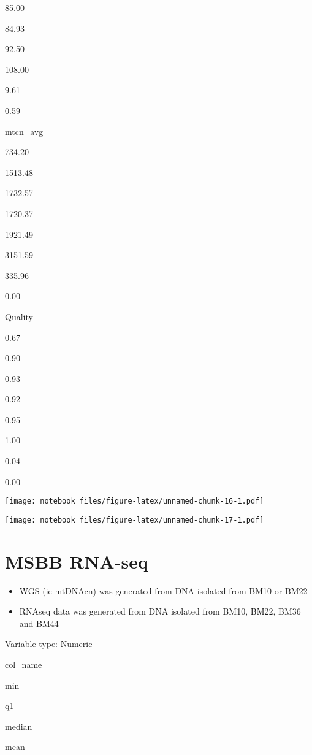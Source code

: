 \documentclass[]{book}
\providecommand{\tightlist}{%
  \setlength{\itemsep}{0pt}\setlength{\parskip}{0pt}}
\begin{document}
85.00

84.93

92.50

108.00

9.61

0.59

mtcn\_avg

734.20

1513.48

1732.57

1720.37

1921.49

3151.59

335.96

0.00

Quality

0.67

0.90

0.93

0.92

0.95

1.00

0.04

0.00

\texttt{[image: notebook\_files/figure-latex/unnamed-chunk-16-1.pdf]}

\hypertarget{htmlwidget-85df3e376dcce9f518ab}{}
\begin{datatables}

\end{datatables}

\texttt{[image: notebook\_files/figure-latex/unnamed-chunk-17-1.pdf]}

\hypertarget{msbb-rna-seq}{%
\section{MSBB RNA-seq}\label{msbb-rna-seq}}

\begin{itemize}
\tightlist
\item
  WGS (ie mtDNAcn) was generated from DNA isolated from BM10 or BM22
\item
  RNAseq data was generated from DNA isolated from BM10, BM22, BM36 and BM44
\end{itemize}

\label{tab:msbb-rna-numeric}Variable type: Numeric

col\_name

min

q1

median

mean
\end{document}

